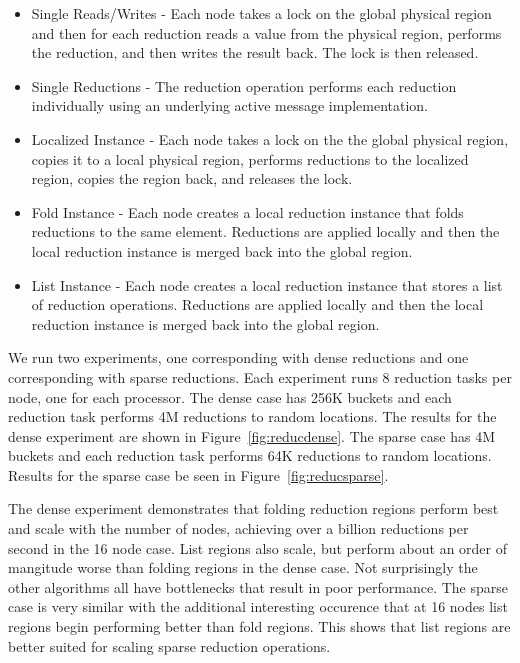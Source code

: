 \begin{itemize} \itemsep1pt \parskip0pt 
\item Single Reads/Writes - Each node takes a lock on the global physical region and then for each reduction
reads a value from the physical region, performs the reduction, and then writes the result back.  The lock is then released.
\item Single Reductions - The reduction operation performs each reduction individually
using an underlying active message implementation.
\item Localized Instance - Each node takes a lock on the the global physical region, copies it to a local physical
region, performs reductions to the localized region, copies the region back, and releases the lock.
\item Fold Instance - Each node creates a local reduction instance that folds reductions to the same element.
Reductions are applied locally and then the local reduction instance is merged back into the global region.
\item List Instance - Each node creates a local reduction instance that stores a list of reduction operations.
Reductions are applied locally and then the local reduction instance is merged back into the global region.
\end{itemize}

We run two experiments, one corresponding with dense reductions and one corresponding with sparse
reductions.  Each experiment runs 8 reduction tasks per node, one for each processor.  The dense
case has 256K buckets and each reduction task performs 4M reductions to random locations.  The results for the
dense experiment are shown in Figure~\ref{fig:reducdense}.  The sparse case has 4M buckets and
each reduction task performs 64K reductions to random locations.  Results for the sparse case
be seen in Figure~\ref{fig:reducsparse}.

The dense experiment demonstrates that folding reduction regions perform 
best and scale with the number of nodes, achieving over a billion reductions
per second in the 16 node case.  List regions also scale, but perform about an
order of mangitude worse than folding regions in the dense case.  Not surprisingly
the other algorithms all have bottlenecks that result in poor performance.  The
sparse case is very similar with the additional interesting occurence that at 16 nodes
list regions begin performing better than fold regions.  This shows that
list regions are better suited for scaling sparse reduction operations.

